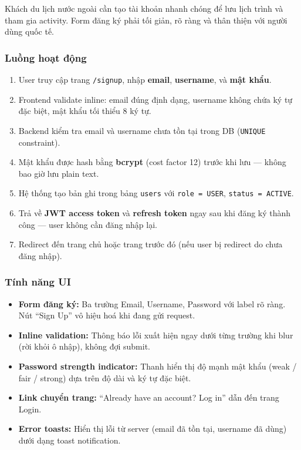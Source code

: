 \documentclass[12pt,a4paper]{article}
\begin{document}
Khách du lịch nước ngoài cần tạo tài khoản nhanh chóng để lưu lịch trình và
tham gia activity. Form đăng ký phải tối giản, rõ ràng và thân thiện với người
dùng quốc tế.

\subsubsection{Luồng hoạt động}

\begin{enumerate}
  \item User truy cập trang \texttt{/signup}, nhập \textbf{email},
        \textbf{username}, và \textbf{mật khẩu}.
  \item Frontend validate inline: email đúng định dạng, username không chứa
        ký tự đặc biệt, mật khẩu tối thiểu 8 ký tự.
  \item Backend kiểm tra email và username chưa tồn tại trong DB
        (\texttt{UNIQUE} constraint).
  \item Mật khẩu được hash bằng \textbf{bcrypt} (cost factor 12) trước khi
        lưu --- không bao giờ lưu plain text.
  \item Hệ thống tạo bản ghi trong bảng \texttt{users} với
        \texttt{role = USER}, \texttt{status = ACTIVE}.
  \item Trả về \textbf{JWT access token} và \textbf{refresh token} ngay sau
        khi đăng ký thành công --- user không cần đăng nhập lại.
  \item Redirect đến trang chủ hoặc trang trước đó (nếu user bị redirect do
        chưa đăng nhập).
\end{enumerate}

\subsubsection{Tính năng UI}

\begin{itemize}
  \item \textbf{Form đăng ký:} Ba trường Email, Username, Password với
        label rõ ràng. Nút ``Sign Up'' vô hiệu hoá khi đang gửi request.
  \item \textbf{Inline validation:} Thông báo lỗi xuất hiện ngay dưới từng
        trường khi blur (rời khỏi ô nhập), không đợi submit.
  \item \textbf{Password strength indicator:} Thanh hiển thị độ mạnh mật
        khẩu (weak / fair / strong) dựa trên độ dài và ký tự đặc biệt.
  \item \textbf{Link chuyển trang:} ``Already have an account? Log in''
        dẫn đến trang Login.
  \item \textbf{Error toasts:} Hiển thị lỗi từ server (email đã tồn tại,
        username đã dùng) dưới dạng toast notification.
\end{itemize}
\end{document}
